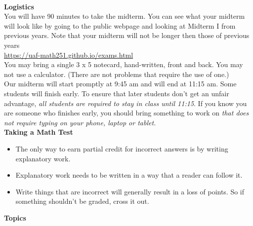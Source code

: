 \documentclass[11pt,fleqn]{article}
\begin{document}
\renewcommand{\headrulewidth}{0pt}
\newcommand{\blank}[1]{\rule{#1}{0.75pt}}
\newcommand{\bc}{\begin{center}}
\newcommand{\ec}{\end{center}}
\renewcommand{\d}{\displaystyle}

\vspace*{-0.7in}

\begin{center}
  \large
  \\
\end{center}
\noindent\textbf{Logistics}\\

You will have 90 minutes to take the midterm. You can see what your midterm will look like by going to the public webpage and looking at Midterm I from previous years. Note that your midterm will not be longer then those of previous years\\

\url{https://uaf-math251.github.io/exams.html}\\

You may bring a single 3 x 5 notecard, hand-written, front and back. You may not use a calculator. (There are not problems that require the use of one.)\\

Our midterm will start promptly at 9:45 am and will end at 11:15 am.  Some students will finish early. To ensure that later students don't get an unfair advantage, \emph{all students are required to stay in class until 11:15}. If you know you are someone who finishes early, you should bring something to work on \emph{that does not require typing on your phone, laptop or tablet.}\\

\noindent\textbf{Taking a Math Test}\\

\begin{itemize}
\item The only way to earn partial credit for incorrect answers is by writing explanatory work.
\item Explanatory work needs to be written in a way that a reader can follow it.
\item Write things that are incorrect will generally result in a loss of points. So if something shouldn't be graded, cross it out.
\end{itemize}


\noindent\textbf{Topics}\\
\end{document}
